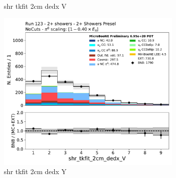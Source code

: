 \begin{figure}[H]
\begin{subfigure}{0.3\textwidth}
    \caption{shr tkfit 2cm dedx V}
    \end{subfigure}
    \begin{subfigure}{0.3\textwidth}
    \includegraphics[width=1.0\textwidth]{Sidebands/Figures/TwoShr_1e0pSel/Presel/shr_tkfit_2cm_dedx_V.pdf}
    \caption{shr tkfit 2cm dedx Y}
    \end{subfigure}
    \caption{} 
    \label{fig:HE_1eNp_1}
\end{figure}


